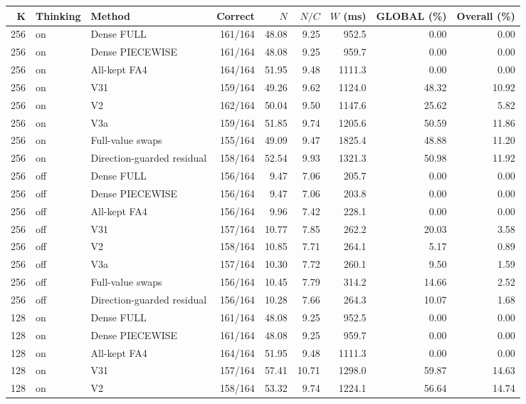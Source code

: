 \begin{tabular}{rllrrrrrr}
\toprule
K & Thinking & Method & Correct & $N$ & $N/C$ & $W$ (ms) & GLOBAL (\%) & Overall (\%) \\
\midrule
256 & on & Dense FULL & 161/164 & 48.08 & 9.25 & 952.5 & 0.00 & 0.00 \\
256 & on & Dense PIECEWISE & 161/164 & 48.08 & 9.25 & 959.7 & 0.00 & 0.00 \\
256 & on & All-kept FA4 & 164/164 & 51.95 & 9.48 & 1111.3 & 0.00 & 0.00 \\
256 & on & V31 & 159/164 & 49.26 & 9.62 & 1124.0 & 48.32 & 10.92 \\
256 & on & V2 & 162/164 & 50.04 & 9.50 & 1147.6 & 25.62 & 5.82 \\
256 & on & V3a & 159/164 & 51.85 & 9.74 & 1205.6 & 50.59 & 11.86 \\
256 & on & Full-value swaps & 155/164 & 49.09 & 9.47 & 1825.4 & 48.88 & 11.20 \\
256 & on & Direction-guarded residual & 158/164 & 52.54 & 9.93 & 1321.3 & 50.98 & 11.92 \\
256 & off & Dense FULL & 156/164 & 9.47 & 7.06 & 205.7 & 0.00 & 0.00 \\
256 & off & Dense PIECEWISE & 156/164 & 9.47 & 7.06 & 203.8 & 0.00 & 0.00 \\
256 & off & All-kept FA4 & 156/164 & 9.96 & 7.42 & 228.1 & 0.00 & 0.00 \\
256 & off & V31 & 157/164 & 10.77 & 7.85 & 262.2 & 20.03 & 3.58 \\
256 & off & V2 & 158/164 & 10.85 & 7.71 & 264.1 & 5.17 & 0.89 \\
256 & off & V3a & 157/164 & 10.30 & 7.72 & 260.1 & 9.50 & 1.59 \\
256 & off & Full-value swaps & 156/164 & 10.45 & 7.79 & 314.2 & 14.66 & 2.52 \\
256 & off & Direction-guarded residual & 156/164 & 10.28 & 7.66 & 264.3 & 10.07 & 1.68 \\
128 & on & Dense FULL & 161/164 & 48.08 & 9.25 & 952.5 & 0.00 & 0.00 \\
128 & on & Dense PIECEWISE & 161/164 & 48.08 & 9.25 & 959.7 & 0.00 & 0.00 \\
128 & on & All-kept FA4 & 164/164 & 51.95 & 9.48 & 1111.3 & 0.00 & 0.00 \\
128 & on & V31 & 157/164 & 57.41 & 10.71 & 1298.0 & 59.87 & 14.63 \\
128 & on & V2 & 158/164 & 53.32 & 9.74 & 1224.1 & 56.64 & 14.74 \\

\end{tabular}
